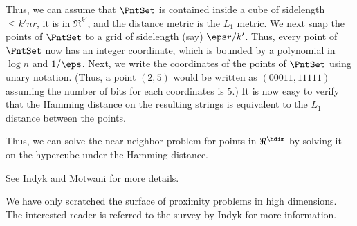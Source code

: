 Thus, we can assume that $\PntSet$ is contained inside a cube of
sidelength $\leq k'nr$, it is in $\Re^{k'}$, and the distance metric
is the $L_1$ metric. We next snap the points of $\PntSet$ to a grid of
sidelength (say) $\eps r/k'$. Thus, every point of $\PntSet$ now has
an integer coordinate, which is bounded by a polynomial in $\log n$
and $1/\eps$. Next, we write the coordinates of the points of
$\PntSet$ using unary notation. (Thus, a point $(2,5)$ would be
written as $(00011,11111)$ assuming the number of bits for each
coordinates is $5$.) It is now easy to verify that the Hamming
distance on the resulting strings is equivalent to the $L_1$ distance
between the points.

Thus, we can solve the near neighbor problem for points in $\Re^\hdim$
by solving it on the hypercube under the Hamming distance.

See Indyk and Motwani \cite{im-anntr-98} for more details.

\bigskip

We have only scratched the surface of proximity problems in high
dimensions. The interested reader is referred to the survey by Indyk
\cite{a-rs-04} for more information.




\ChapterEnd{}

%
